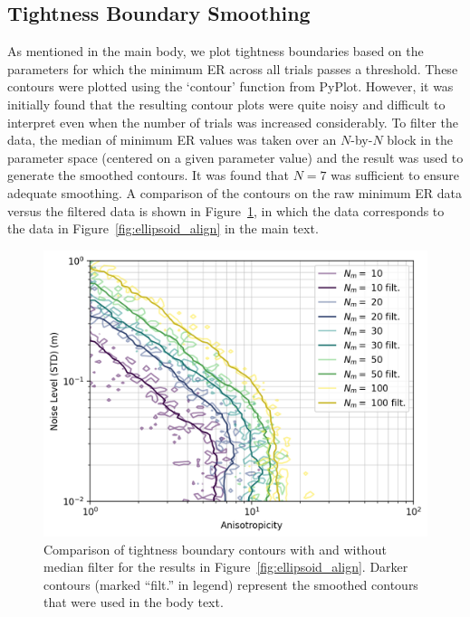 \documentclass[lettersize,journal]{IEEEtran}
\begin{document}
\subsection{Tightness Boundary Smoothing}\label{App:Smoothing}

As mentioned in the main body, we plot tightness boundaries based on the parameters for which the minimum ER across all trials passes a threshold. These contours were plotted using the `contour' function from PyPlot.  However, it was initially found that the resulting contour plots were quite noisy and difficult to interpret even when the number of trials was increased considerably. To filter the data, the median of minimum ER  values was taken over an $N$-by-$N$ block in the parameter space (centered on a given parameter value) and the result was used to generate the smoothed contours. It was found that $N=7$ was sufficient to ensure adequate smoothing. A comparison of the contours on the raw minimum ER  data versus the filtered data is shown in Figure~\ref{fig:filter}, in which the data corresponds to the data in Figure~\ref{fig:ellipsoid_align} in the main text. 
\begin{figure}[!ht]
	\centering
	\includegraphics[width=\columnwidth]{figs/filter_compare}
	\caption{Comparison of tightness boundary contours with and without median filter for the results in Figure~\ref{fig:ellipsoid_align}. Darker contours (marked ``filt.'' in legend) represent the smoothed contours that were used in the body text.}
	\label{fig:filter}
\end{figure}
\end{document}
